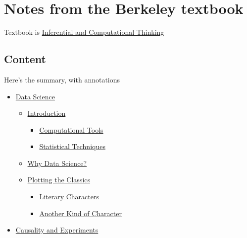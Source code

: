 \hypertarget{notes-from-the-berkeley-textbook}{%
\section{Notes from the Berkeley
textbook}\label{notes-from-the-berkeley-textbook}}

Textbook is \href{https://www.inferentialthinking.com}{Inferential and
Computational Thinking}

\hypertarget{content}{%
\subsection{Content}\label{content}}

Here's the summary, with annotations

\begin{itemize}
\tightlist
\item
  \href{chapters/01/what-is-data-science.md}{Data Science}

  \begin{itemize}
  \tightlist
  \item
    \href{chapters/01/1/intro.md}{Introduction}

    \begin{itemize}
    \tightlist
    \item
      \href{chapters/01/1/1/computational-tools.md}{Computational Tools}
    \item
      \href{chapters/01/1/2/statistical-techniques.md}{Statistical
      Techniques}
    \end{itemize}
  \item
    \href{chapters/01/2/why-data-science.md}{Why Data Science?}
  \item
    \href{chapters/01/3/plotting-the-classics.md}{Plotting the Classics}

    \begin{itemize}
    \tightlist
    \item
      \href{chapters/01/3/1/literary-characters.md}{Literary Characters}
    \item
      \href{chapters/01/3/2/another-kind-of-character.md}{Another Kind
      of Character}
    \end{itemize}
  \end{itemize}
\item
  \href{chapters/02/causality-and-experiments.md}{Causality and
  Experiments}


\end{itemize}
